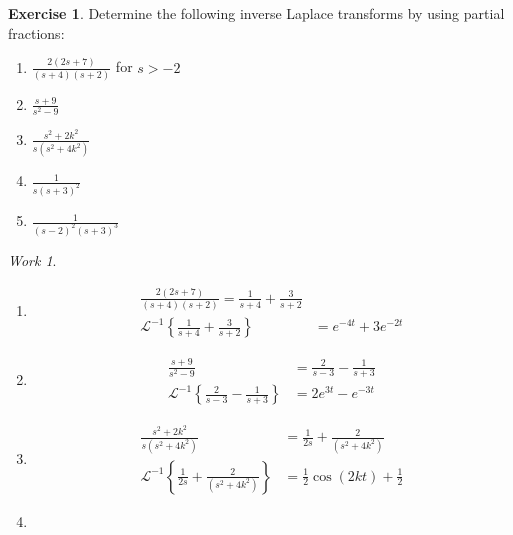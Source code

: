 \documentclass{report}
\theoremstyle{definition}
\newtheorem{exercise}{Exercise}[chapter]
\theoremstyle{remark}
\newtheorem*{work}{Work}
\newcommand{\inlt}[1]{\mathscr{L}^{-1} \left\{ #1 \right\}}
\begin{document}
\begin{exercise}
    Determine the following inverse Laplace transforms by using partial fractions:
    \begin{enumerate}[label = (\alph*)]
        \item $\displaystyle{\frac{2(2s+7)}{(s+4)(s+2)}}$ for $s>-2$
        \item $\displaystyle{\frac{s+9}{s^2-9}}$
        \item $\displaystyle{\frac{s^2+2k^2}{s(s^2+4k^2)}}$
        \item $\displaystyle{\frac{1}{s(s+3)^2}}$
        \item $\displaystyle{\frac{1}{(s-2)^2(s+3)^3}}$
    \end{enumerate}
\end{exercise}
\begin{work}
    \begin{enumerate}[label = (\alph*)]
        \item \begin{equation*}
            \begin{split}
                \frac{2(2s+7)}{(s+4)(s+2)} = \frac{1}{s+4} + \frac{3}{s+2} \\
                \inlt{\frac{1}{s+4} + \frac{3}{s+2}} &=e^{-4t}+3e^{-2t}
            \end{split}
        \end{equation*}
        \item \begin{equation*}
            \begin{split}
                \frac{s+9}{s^2-9} &= \frac{2}{s-3}-\frac{1}{s+3} \\
                \inlt{\frac{2}{s-3}-\frac{1}{s+3}} &= 2e^{3t} - e^{-3t}
            \end{split}
        \end{equation*}
        \item \begin{equation*}
            \begin{split}
                \frac{s^2+2k^2}{s(s^2+4k^2)} &= \frac{1}{2s}+\frac{2}{(s^2+4k^2)} \\
                \inlt{\frac{1}{2s}+\frac{2}{(s^2+4k^2)}} &= \frac{1}{2}\cos (2kt) + \frac{1}{2}
            \end{split}
        \end{equation*}
        \item \begin{equation*}
            \begin{split}

\end{split}
\end{equation*}
\end{enumerate}
\end{work}
\end{document}
